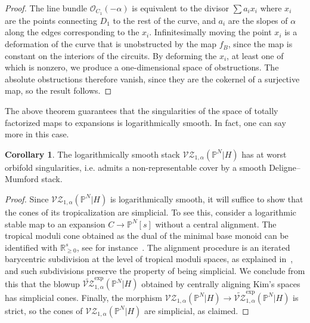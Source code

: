 \documentclass[11pt]{amsart}
\renewcommand{\to}{\rightarrow}
\theoremstyle{definition}
\newtheorem{cor}[thm]{Corollary}
\theoremstyle{definition}
\begin{document}
\begin{proof}
The line bundle $\mathcal O_{C_1}(-\alpha)$ is equivalent to the divisor $\sum a_i x_i$ where $x_i$ are the points connecting $D_1$ to the rest of the curve, and $a_i$ are the slopes of $\alpha$ along the edges corresponding to the $x_i$. Infinitesimally moving the point $x_i$ is a deformation of the curve that is unobstructed by the map $f_B$, since the map is constant on the interiors of the circuits. By deforming the $x_i$, at least one of which is nonzero, we produce a one-dimensional space of obstructions. The absolute obstructions therefore vanish, since they are the cokernel of a surjective map, so the result follows.  
\end{proof}

The above theorem guarantees that the singularities of the space of totally factorized maps to expansions is logarithmically smooth. In fact, one can say more in this case.

\begin{cor}
The logarithmically smooth stack $\mathcal{VZ}_{1,\alpha}(\mathbb P^N|H)$ has at worst orbifold singularities, i.e. admits a non-representable cover by a smooth Deligne--Mumford stack.
\end{cor}

\begin{proof}
Since $\mathcal{VZ}_{1,\alpha}(\mathbb P^N|H)$ is logarithmically smooth, it will suffice to show that the cones of its tropicalization are simplicial. To see this, consider a logarithmic stable map to an expansion $C\to \mathbb P^N[s]$ without a central alignment. The tropical moduli cone obtained as the dual of the minimal base monoid can be identified with $\mathbb R_{\geq 0}^{s}$, see for instance~\cite[Section~2.2]{ChenDegeneration}. The alignment procedure is an iterated barycentric subdivision at the level of tropical moduli spaces, as explained in~\cite[Section 4.6]{RSPW}, and such subdivisions preserve the property of being simplicial. We conclude from this that the blowup $\widetilde{\mathcal{VZ}}^{\mathrm{exp}}_{1,\alpha}(\mathbb P^N|H)$ obtained by centrally aligning Kim's spaces has simplicial cones. Finally, the morphism $\mathcal{VZ}_{1,\alpha}(\mathbb P^N|H)\to \widetilde{\mathcal{VZ}}^{\mathrm{exp}}_{1,\alpha}(\mathbb P^N|H)$ is strict, so the cones of $\mathcal{VZ}_{1,\alpha}(\mathbb P^N|H)$ are simplicial, as claimed.
\end{proof}
\end{document}
